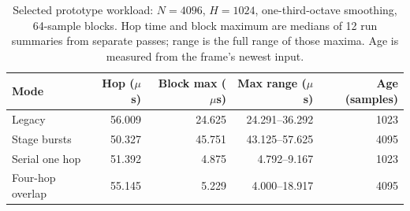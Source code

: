 \begin{table}[tb]
\centering\small
\begin{tabular}{@{}lrrrr@{}}
\toprule
Mode & Hop ($\mu$s) & Block max ($\mu$s) & Max range ($\mu$s) & Age (samples) \\
\midrule
Legacy & 56.009 & 24.625 & 24.291--36.292 & 1023 \\
Stage bursts & 50.327 & 45.751 & 43.125--57.625 & 4095 \\
Serial one hop & 51.392 & 4.875 & 4.792--9.167 & 1023 \\
Four-hop overlap & 55.145 & 5.229 & 4.000--18.917 & 4095 \\
\bottomrule
\end{tabular}
\caption{Selected prototype workload: $N=4096$, $H=1024$, one-third-octave smoothing, 64-sample blocks. Hop time and block maximum are medians of 12 run summaries from separate passes; range is the full range of those maxima. Age is measured from the frame's newest input.}
\label{tab:pipeline}
\end{table}
